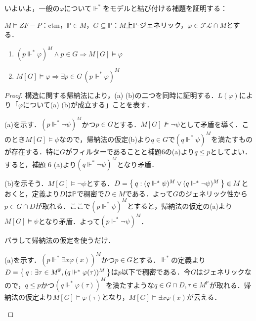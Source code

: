 \documentclass[a4j]{bxjsarticle}
\theoremstyle{definition}
\begin{document}
いよいよ，一般の$\varphi$について$\mathrel{\Vdash^*}$をモデルと結び付ける補題を証明する：

\begin{lemma}\label{lem:forces-and-genexts}
 $M \models ZF-P$：ctm，$\mathbb{P} \in M$，$G \subseteq \mathbb{P}$：$M$上$\mathbb{P}$-ジェネリック，$\varphi \in \mathcal{FL} \cap M$とする．
 \begin{enumerate}[label=(\alph*)]
  \item $(p \mathrel{\Vdash^*} \varphi)^M \wedge p \in G\Rightarrow M[G] \models \varphi$
  \item $M[G] \models \varphi \Rightarrow \exists p \in G\, (p \mathrel{\Vdash^*} \varphi)^M$
	\label{forces:truth-internal}
 \end{enumerate}
\end{lemma}
\begin{proof}
 構造に関する帰納法により，(a) (b)の二つを同時に証明する．$L(\varphi)$により「$\varphi$について(a) (b)が成立する」ことを表す．

\begin{description}[style=nextline,font=\underline]
 \item[$L(\psi) \rightarrow L(\neg \psi)$] 
  (a)を示す．$(p \mathrel{\Vdash^*} \neg \psi)^M$かつ$p \in G$とする．$M[G] \not\models \neg \psi$として矛盾を導く．このとき$M[G] \models \psi$なので，帰納法の仮定(b)より$q \in G$で$(q \mathrel{\Vdash^*} \psi)^M$を満たすものが存在する．特に$G$がフィルターであることと補題6の(a)より$q \leq p$としてよい．すると，補題 6 (a)より$(q \mathrel{\Vdash^*} \neg \psi)^M$となり矛盾．

 (b)を示そう．$M[G] \models \neg \psi$とする．$D = \Set{ q : (q \mathrel{\Vdash^*} \psi)^M \vee (q \mathrel{\Vdash^*} \neg \psi)^M} \in M$とおくと，定義より$D$は$\mathbb{P}$で稠密で$D \in M$である．よって$G$のジェネリック性から$p \in G \cap D$が取れる．ここで$(p \mathrel{\Vdash^*} \psi)^M$とすると，帰納法の仮定の(a)より$M[G] \models \psi$となり矛盾．よって$(p \mathrel{\Vdash^*} \neg \psi)^M$．

 \item[$L(\varphi), L(\psi) \rightarrow L(\varphi \wedge \psi)$] 
 バラして帰納法の仮定を使うだけ．

 \item[{$\forall \tau \in M^\mathbb{P} [L(\varphi(\tau))] \rightarrow L(\exists x \varphi(x))$}](a)を示す．$(p \mathrel{\Vdash^*} \exists x \varphi(x))^M$かつ$p \in G$とする．$\mathrel{\Vdash^*}$の定義より$D = \Set{q : \exists \tau \in M^\mathbb{P}, (q \mathrel{\Vdash^*} \varphi(\tau))^M}$は$p$以下で稠密である．今$G$はジェネリックなので，$q \leq p$かつ$(q \mathrel{\Vdash^*} \varphi(\tau))^M$を満たすような$q \in G \cap D, \tau \in M^\mathbb{P}$が取れる．帰納法の仮定より$M[G] \models \varphi(\tau)$となり，$M[G] \models \exists x \varphi(x)$が云える．


\end{description}
\end{proof}
\end{document}
